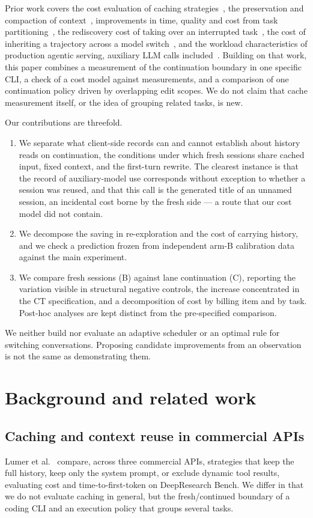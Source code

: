 \documentclass[a4paper,11pt]{article}
\begin{document}
Prior work covers the cost evaluation of caching strategies~\cite{dontbreakcache}, the preservation and compaction of context~\cite{cmv}, improvements in time, quality and cost from task partitioning~\cite{cocoder}, the rediscovery cost of taking over an interrupted task~\cite{handoffdebt}, the cost of inheriting a trajectory across a model switch~\cite{handofftax}, and the workload characteristics of production agentic serving, auxiliary LLM calls included~\cite{agenticworkloads}. Building on that work, this paper combines a measurement of the continuation boundary in one specific CLI, a check of a cost model against measurements, and a comparison of one continuation policy driven by overlapping edit scopes. We do not claim that cache measurement itself, or the idea of grouping related tasks, is new.

Our contributions are threefold.
\begin{enumerate}
\item We separate what client-side records can and cannot establish about history reads on continuation, the conditions under which fresh sessions share cached input, fixed context, and the first-turn rewrite. The clearest instance is that the record of auxiliary-model use corresponds without exception to whether a session was reused, and that this call is the generated title of an unnamed session, an incidental cost borne by the fresh side --- a route that our cost model did not contain.
\item We decompose the saving in re-exploration and the cost of carrying history, and we check a prediction frozen from independent arm-B calibration data against the main experiment.
\item We compare fresh sessions (B) against lane continuation (C), reporting the variation visible in structural negative controls, the increase concentrated in the CT specification, and a decomposition of cost by billing item and by task. Post-hoc analyses are kept distinct from the pre-specified comparison.
\end{enumerate}
We neither build nor evaluate an adaptive scheduler or an optimal rule for switching conversations. Proposing candidate improvements from an observation is not the same as demonstrating them.

\section{Background and related work}\label{sec:related}
\subsection{Caching and context reuse in commercial APIs}
Lumer et al.~\cite{dontbreakcache} compare, across three commercial APIs, strategies that keep the full history, keep only the system prompt, or exclude dynamic tool results, evaluating cost and time-to-first-token on DeepResearch Bench. We differ in that we do not evaluate caching in general, but the fresh/continued boundary of a coding CLI and an execution policy that groups several tasks.
\end{document}
